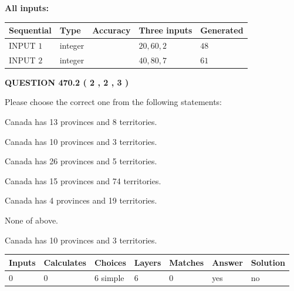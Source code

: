 \documentclass[12pt]{article}
\begin{document}
   
   
   
\noindent\vspace{0.1in}\hspace{-0.08in} {\textbf{\Large{All inputs: }}}
   
   
  
  
\noindent\begin{tabular}{|l|l|l|l|l|}
\hline
 Sequential & Type & Accuracy & Three inputs & Generated \\ 
\hline
 
 
  INPUT $  1 $ & integer &  & $
 20
 , 
 60
 , 
 2
 $ & $ 48 $ 
 \\  \hline  
 
 
  INPUT $  2 $ & integer &  & $
 40
 , 
 80
 , 
 7
 $ & $ 61 $ 
 \\  \hline  
 \end{tabular}
   
   
  
\vspace{0.2in}
  
{\textbf{\Large{QUESTION
470.2 
 ( 2 , 2 , 3 )
}}}
  
  
Please choose the correct one from the following statements:
 
 
Canada has  13 provinces and  8 territories.
 
 
Canada has 10  provinces and 3 territories.
 
 
Canada has  26 provinces and  5 territories.
 
 
Canada has  15 provinces and  74 territories.
 
 
Canada has   4 provinces and  19 territories.
 
 
 None of above.
 
 
\noindent{}
 
 
Canada has 10  provinces and 3 territories.
 
 
\noindent{}
 
 
   
   
   
   
\noindent\begin{tabular}{|l|l|l|l|l|l|l|}
 \hline
Inputs & Calculates & Choices & Layers & Matches & Answer & Solution \\ \hline
 0  & 
 0  & 
 6
  simple  
  & 
 6  & 
 0  & 
  yes & 
  no 
  \\ \hline
 \end{tabular}
   
\end{document}
